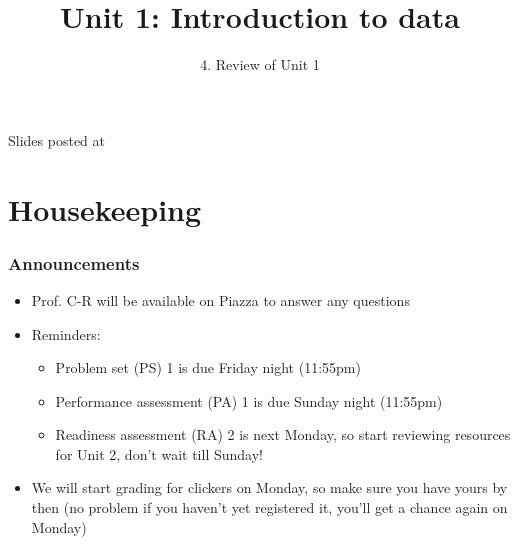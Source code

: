 \documentclass[slidestop,compress,mathserif,12pt,t,professionalfonts,xcolor=table]{beamer}
\title{Unit 1: Introduction to data}
\subtitle{4. Review of Unit 1}
\author{\CourseName}
\date{}
\institute{\InstituteName}
\begin{document}



\begin{frame}[plain]

\titlepage

\vfill

{\scriptsize {} \hfill Slides posted at  \webURL{\CourseSite}}

\addtocounter{framenumber}{-1} 

\end{frame}


\section{Housekeeping}


\begin{frame}
\frametitle{Announcements}

\begin{itemize}

\item Prof. C-R will be available on Piazza to answer any questions

\item Reminders:
\begin{itemize}
\item Problem set (PS) 1 is due Friday night (11:55pm)

\item Performance assessment (PA) 1 is due Sunday night (11:55pm)

\item Readiness assessment (RA) 2 is next Monday, so start reviewing resources for Unit 2, 
don't wait till Sunday!
\end{itemize}

\item We will start grading for clickers on Monday, so make sure you have yours by then (no problem if you
haven't yet registered it, you'll get a chance again on Monday)

\end{itemize}

\end{frame}

\end{document}
